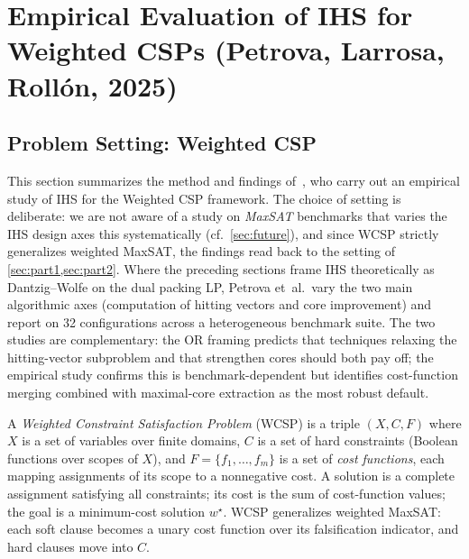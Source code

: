 \section{Empirical Evaluation of IHS for Weighted CSPs (Petrova, Larrosa, Roll\'on, 2025)}
\label{sec:part3}

\subsection{Problem Setting: Weighted CSP}
\label{sec:wcsp}

This section summarizes the method and findings of~\citet{petrova2025empirical},
who carry out an empirical study of IHS for the Weighted CSP framework. The
choice of setting is deliberate: we are not aware of a study on \emph{MaxSAT}
benchmarks that varies the IHS design axes this systematically (cf.\
\cref{sec:future}), and since WCSP strictly generalizes weighted MaxSAT, the
findings read back to the setting of \cref{sec:part1,sec:part2}. Where
the preceding sections frame IHS theoretically as Dantzig--Wolfe on the dual
packing LP, Petrova et~al.\ vary the two main algorithmic axes (computation of
hitting vectors and core improvement) and report on 32 configurations across a
heterogeneous benchmark suite. The two studies are complementary: the OR
framing predicts that techniques relaxing the hitting-vector subproblem and that
strengthen cores should both pay off; the empirical study confirms this is
benchmark-dependent but identifies cost-function merging combined with
maximal-core extraction as the most robust default.

A \emph{Weighted Constraint Satisfaction Problem} (WCSP) is a triple
$(X, C, F)$ where $X$ is a set of variables over finite domains, $C$ is a set
of hard constraints (Boolean functions over scopes of $X$), and
$F = \{f_1, \ldots, f_m\}$ is a set of \emph{cost functions}, each mapping
assignments of its scope to a nonnegative cost. A solution is a complete
assignment satisfying all constraints; its cost is the sum of cost-function
values; the goal is a minimum-cost solution $w^\star$. WCSP generalizes
weighted MaxSAT: each soft clause becomes a unary cost function over its
falsification indicator, and hard clauses move into $C$.

